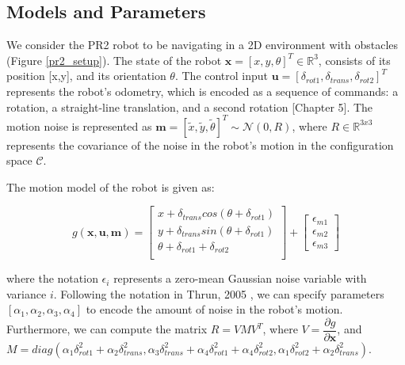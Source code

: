 \documentclass[journal]{IEEEtran}
\begin{document}
\subsection{Models and Parameters}
We consider the PR2 robot to be navigating in a 2D environment with obstacles (Figure \ref{pr2_setup}). The state of the robot $\textbf{x} = [x,y,\theta]^T \in \mathbb{R}^3$, consists of its position [x,y], and its orientation $\theta$. The control input $\textbf{u} = [\delta_{rot1},\delta_{trans},\delta_{rot2}]^T$ represents the robot's odometry, which is encoded as a sequence of commands: a rotation, a straight-line translation, and a second rotation \cite{IEEEhowto:thrun} [Chapter 5]. The motion noise is represented as $\textbf{m} = [\tilde{x},\tilde{y},\tilde{\theta}]^T \sim \mathcal{N}(0,R)$, where $R \in \mathbb{R}^{3x3}$ represents the covariance of the noise in the robot's motion in the configuration space $\mathcal{C}$. 

The motion model of the robot is given as:

  $$g(\textbf{x},\textbf{u},\textbf{m}) =\begin{bmatrix}
  x + \delta_{trans}cos(\theta + \delta_{rot1})\\
  y + \delta_{trans}sin(\theta + \delta_{rot1})\\
  \theta + \delta_{rot1} + \delta_{rot2}\\
\end{bmatrix} + \begin{bmatrix}
  \epsilon_{m1} \\
  \epsilon_{m2} \\
  \epsilon_{m3}
\end{bmatrix}$$


where the notation $\epsilon_i$ represents a zero-mean Gaussian noise variable with variance $i$. Following the notation in Thrun, 2005 \cite{IEEEhowto:thrun}, we can specify parameters $[\alpha_1,\alpha_2,\alpha_3,\alpha_4]$ to encode the amount of noise in the robot's motion. Furthermore, we can compute the matrix $R = VMV^T$, where $V = \dfrac{\partial g}{\partial \textbf{x}}$, and $M = diag(\alpha_1\delta_{rot1}^2 + \alpha_2\delta_{trans}^2,\alpha_3\delta_{trans}^2 + \alpha_4\delta_{rot1}^2 + \alpha_4\delta_{rot2}^2,\alpha_1\delta_{rot2}^2 + \alpha_2\delta_{trans}^2)$.
\end{document}
